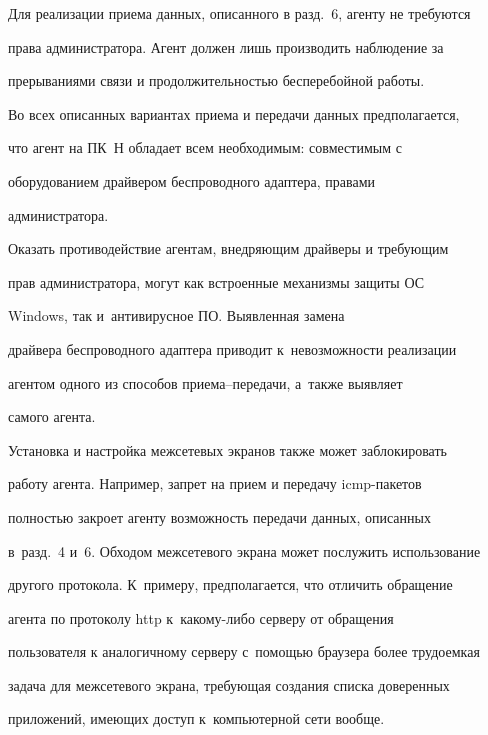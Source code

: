   Для реализации приема данных, описанного в разд.~6, агенту не требуются


права администратора. Агент должен лишь производить наблюдение за


прерываниями связи и продолжительностью бесперебойной работы.





  Во всех описанных вариантах приема и передачи данных предполагается,


что агент на ПК~Н обладает всем необходимым: совместимым с


оборудованием драйвером беспроводного адаптера, правами


администратора.





  Оказать противодействие агентам, внедряющим драйверы и требующим


прав администратора, могут как встроенные механизмы защиты ОС


Windows, так и~антивирусное ПО. Выявленная замена


драйвера беспроводного адаптера приводит к~невозможности реализации


агентом одного из способов при\-е\-ма--пе\-ре\-да\-чи, а~так\-же выявляет


самого агента.





  Установка и настройка межсетевых экранов также может заблокировать


работу агента. Например, запрет на прием и передачу icmp-па\-ке\-тов


полностью закроет агенту возможность передачи данных, описанных


в~разд.~4 и~6. Обходом межсетевого экрана может послужить использование


другого протокола. К~примеру, предполагается, что отличить обращение


агента по протоколу {\sf http} к~ка\-ко\-му-ли\-бо серверу от обращения


пользователя к аналогичному серверу с~по\-мощью браузера более трудоемкая


задача для межсетевого экрана, требующая создания списка доверенных


приложений, имеющих доступ к~компьютерной сети вообще.


{ %





}





